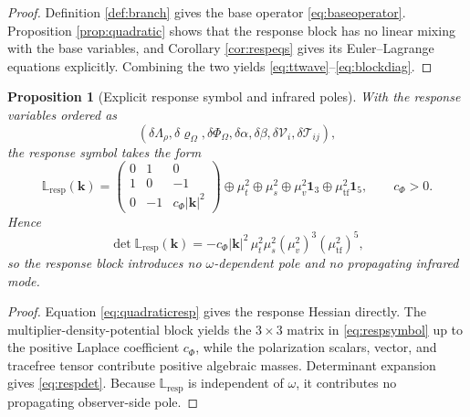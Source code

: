 \documentclass[11pt]{article}
\newcommand{\FlowPot}{\Phi_\Omega}
\newcommand{\SourceDensity}{\varrho_\Omega}
\newcommand{\SourceMult}{\Lambda_\rho}
\newcommand{\RespLin}{\mathbb L_{\mathrm{resp}}}
\newtheorem{proposition}{Proposition}
\begin{document}
\begin{proof}
Definition \ref{def:branch} gives the base operator \eqref{eq:baseoperator}. Proposition \ref{prop:quadratic} shows that the response block has no linear mixing with the base variables, and Corollary \ref{cor:respeqs} gives its Euler--Lagrange equations explicitly. Combining the two yields \eqref{eq:ttwave}--\eqref{eq:blockdiag}.
\end{proof}

\begin{proposition}[Explicit response symbol and infrared poles]
\label{prop:symbol}
With the response variables ordered as
\[
(\delta\SourceMult,\delta\SourceDensity,\delta\FlowPot,
\delta\alpha,\delta\beta,\delta\mathcal V_i,\delta\mathcal T_{ij}),
\]
the response symbol takes the form
\begin{equation}
\RespLin(\mathbf{k})
=
\begin{pmatrix}
0 & 1 & 0 \\
1 & 0 & -1 \\
0 & -1 & c_\Phi |\mathbf{k}|^2
\end{pmatrix}
\oplus \mu_t^2 \oplus \mu_s^2 \oplus \mu_v^2\mathbf 1_3 \oplus \mu_{\mathrm{tf}}^2\mathbf 1_5,
\qquad
c_\Phi>0.
\label{eq:respsymbol}
\end{equation}
Hence
\begin{equation}
\det\RespLin(\mathbf{k})
=
-c_\Phi |\mathbf{k}|^2\,
\mu_t^2\mu_s^2(\mu_v^2)^3(\mu_{\mathrm{tf}}^2)^5,
\label{eq:respdet}
\end{equation}
so the response block introduces no \(\omega\)-dependent pole and no propagating infrared mode.
\end{proposition}

\begin{proof}
Equation \eqref{eq:quadraticresp} gives the response Hessian directly. The multiplier-density-potential block yields the \(3\times 3\) matrix in \eqref{eq:respsymbol} up to the positive Laplace coefficient \(c_\Phi\), while the polarization scalars, vector, and tracefree tensor contribute positive algebraic masses. Determinant expansion gives \eqref{eq:respdet}. Because \(\RespLin\) is independent of \(\omega\), it contributes no propagating observer-side pole.
\end{proof}
\end{document}

